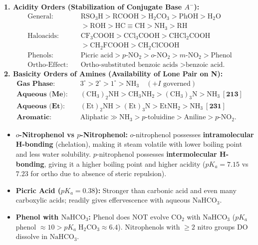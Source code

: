 \documentclass[10pt,twoside,openright]{book}
\begin{document}
\begin{formulabox}
\textbf{1. Acidity Orders (Stabilization of Conjugate Base $A^-$):}
\begin{align*}
  \text{General:} \quad & \mathrm{RSO_3H} > \mathrm{RCOOH} > \mathrm{H_2CO_3} > \mathrm{PhOH} > \mathrm{H_2O} \\
  &> \mathrm{ROH} > \mathrm{HC\equiv CH} > \mathrm{NH_3} > \mathrm{RH} \\
  \text{Haloacids:} \quad & \mathrm{CF_3COOH} > \mathrm{CCl_3COOH} > \mathrm{CHCl_2COOH} \\
  &> \mathrm{CH_2FCOOH} > \mathrm{CH_2ClCOOH} \\
  \text{Phenols:} \quad & \text{Picric acid} > p\text{-NO}_2 > o\text{-NO}_2 > m\text{-NO}_2 > \text{Phenol} \\
  \text{Ortho-Effect:} \quad & \text{Ortho-substituted benzoic acids } > \text{benzoic acid.}
\end{align*}
\textbf{2. Basicity Orders of Amines (Availability of Lone Pair on N):}
\begin{align*}
  \textbf{Gas Phase:} \quad & 3^\circ > 2^\circ > 1^\circ > \mathrm{NH}_3 \quad (+I \text{ governed})\\
  \textbf{Aqueous (Me):} \quad & (\mathrm{CH_3})_2\mathrm{NH} > \mathrm{CH_3NH_2} > (\mathrm{CH_3})_3\mathrm{N} > \mathrm{NH}_3 \ [\textbf{213}]\\
  \textbf{Aqueous (Et):} \quad & (\mathrm{Et})_2\mathrm{NH} > (\mathrm{Et})_3\mathrm{N} > \mathrm{EtNH_2} > \mathrm{NH}_3 \ [\textbf{231}]\\
  \textbf{Aromatic:} \quad & \text{Aliphatic} \gg \mathrm{NH}_3 > p\text{-toluidine} > \text{Aniline} > p\text{-NO}_2.
\end{align*}
\end{formulabox}

\begin{trapbox}
\begin{itemize}
  \item \textbf{$o$-Nitrophenol vs $p$-Nitrophenol:} $o$-nitrophenol possesses \textbf{intramolecular H-bonding} (chelation), making it steam volatile with lower boiling point and less water solubility. $p$-nitrophenol possesses \textbf{intermolecular H-bonding}, giving it a higher boiling point and higher acidity ($pK_a = 7.15$ vs $7.23$ for ortho due to absence of steric repulsion).
  \item \textbf{Picric Acid ($pK_a = 0.38$):} Stronger than carbonic acid and even many carboxylic acids; readily gives effervescence with aqueous $\mathrm{NaHCO}_3$.
  \item \textbf{Phenol with $\mathrm{NaHCO}_3$:} Phenol does NOT evolve $\mathrm{CO}_2$ with $\mathrm{NaHCO}_3$ ($pK_a$ phenol $\approx 10 > pK_a\; \mathrm{H_2CO_3} \approx 6.4$). Nitrophenols with $\ge 2$ nitro groups DO dissolve in $\mathrm{NaHCO}_3$.
\end{itemize}
\end{trapbox}
\end{document}
